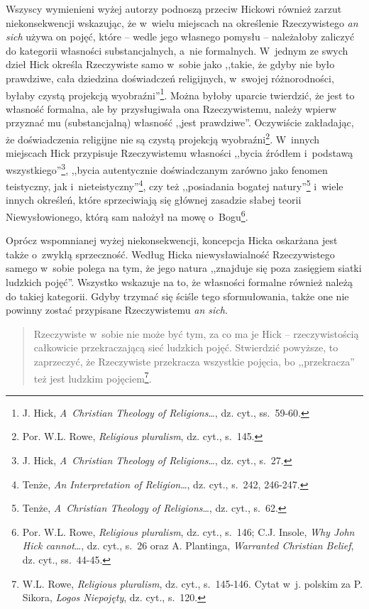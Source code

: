 Wszyscy wymienieni wyżej autorzy podnoszą przeciw Hickowi również zarzut niekonsekwencji wskazując, że w~wielu miejscach na określenie Rzeczywistego \textit{an sich} używa on pojęć, które -- wedle jego własnego pomysłu -- należałoby zaliczyć do kategorii własności substancjalnych, a~nie formalnych. W~jednym ze swych dzieł Hick określa Rzeczywiste samo w~sobie jako ,,takie, że gdyby nie było prawdziwe, cała dziedzina doświadczeń religijnych, w~swojej różnorodności, byłaby czystą projekcją wyobraźni''\footnote{J. Hick, \textit{A~Christian Theology of Religions}\ldots, dz. cyt., ss.~59-60.}. Można byłoby uparcie twierdzić, że jest to własność formalna, ale by przysługiwała ona Rzeczywistemu, należy wpierw przyznać mu (substancjalną) własność ,,jest prawdziwe''. Oczywiście zakładając, że doświadczenia religijne nie są czystą projekcją wyobraźni\footnote{Por. W.L. Rowe, \textit{Religious pluralism}, dz. cyt., s.~145.}. W~innych miejscach Hick przypisuje Rzeczywistemu własności ,,bycia źródłem i~podstawą wszystkiego''\footnote{J. Hick, \textit{A~Christian Theology of Religions}\ldots, dz. cyt., s.~27.}, ,,bycia autentycznie doświadczanym zarówno jako fenomen teistyczny, jak i~nieteistyczny''\footnote{Tenże, \textit{An Interpretation of Religion}\ldots, dz. cyt., s.~242, 246-247.}, czy też ,,posiadania bogatej natury''\footnote{Tenże, \textit{A~Christian Theology of Religions}\ldots, dz. cyt., s.~62.} i~wiele innych określeń, które sprzeciwiają się głównej zasadzie słabej teorii Niewysłowionego, którą sam nałożył na mowę o~Bogu\footnote{Por. W.L. Rowe, \textit{Religious pluralism}, dz. cyt., s.~146; C.J. Insole, \textit{Why John Hick cannot}\ldots, dz. cyt., s.~26 oraz A. Plantinga, \textit{Warranted Christian Belief}, dz. cyt., ss.~44-45.}.

Oprócz wspomnianej wyżej niekonsekwencji, koncepcja Hicka oskarżana jest także o~zwykłą sprzeczność. Według Hicka niewysławialność Rzeczywistego samego w~sobie polega na tym, że jego natura ,,znajduje się poza zasięgiem siatki ludzkich pojęć''. Wszystko wskazuje na to, że własności formalne również należą do takiej kategorii. Gdyby trzymać się ściśle tego sformułowania, także one nie powinny zostać przypisane Rzeczywistemu \textit{an sich}.

\begin{quote}
Rzeczywiste w~sobie nie może być tym, za co ma je Hick -- rzeczywistością całkowicie przekraczającą sieć ludzkich pojęć. Stwierdzić powyższe, to zaprzeczyć, że Rzeczywiste przekracza wszystkie pojęcia, bo ,,przekracza'' też jest ludzkim pojęciem\footnote{W.L. Rowe, \textit{Religious pluralism}, dz. cyt., s.~145-146. Cytat w~j. polskim za P. Sikora, \textit{Logos Niepojęty}, dz. cyt., s.~120.}.
\end{quote}

